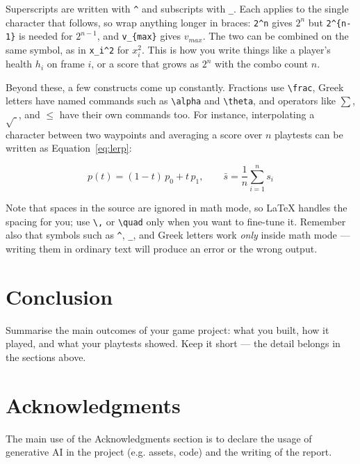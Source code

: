 \documentclass[a4paper,twoside,twocolumn]{IEEEtran}
\begin{document}
Superscripts are written with \verb|^| and subscripts with \verb|_|. Each applies
to the single character that follows, so wrap anything longer in braces:
\verb|2^n| gives $2^n$ but \verb|2^{n-1}| is needed for $2^{n-1}$, and
\verb|v_{max}| gives $v_{max}$. The two can be combined on the same symbol, as in
\verb|x_i^2| for $x_i^2$. This is how you write things like a player's health
$h_i$ on frame $i$, or a score that grows as $2^{n}$ with the combo count $n$.

Beyond these, a few constructs come up constantly. Fractions use \verb|\frac|,
Greek letters have named commands such as \verb|\alpha| and \verb|\theta|, and
operators like $\sum$, $\sqrt{\;}$, and $\leq$ have their own commands too. For
instance, interpolating a character between two waypoints and averaging a score
over $n$ playtests can be written as Equation~\ref{eq:lerp}:

\begin{equation}
p(t) = (1-t)\,p_0 + t\,p_1, \qquad
\bar{s} = \frac{1}{n}\sum_{i=1}^{n} s_i
\label{eq:lerp}
\end{equation}

Note that spaces in the source are ignored in math mode, so LaTeX handles the
spacing for you; use \verb|\,| or \verb|\quad| only when you want to fine-tune
it. Remember also that symbols such as \verb|^|, \verb|_|, and Greek letters work
\emph{only} inside math mode --- writing them in ordinary text will produce an
error or the wrong output.



\section{Conclusion}
\label{sec:conclusion}

Summarise the main outcomes of your game project: what you built, how it played,
and what your playtests showed. Keep it short --- the detail belongs in the
sections above.



\section*{Acknowledgments}
The main use of the Acknowledgments section is to declare the usage of generative AI
in the project (e.g. assets, code) and the writing of the report.
\end{document}
